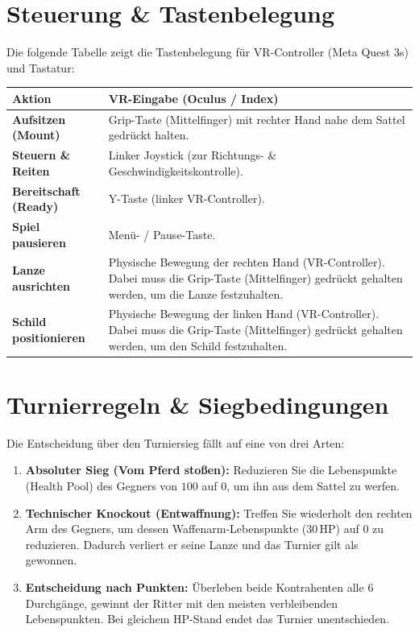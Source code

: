 \documentclass[11pt, a4paper]{article}
\begin{document}
\section{Steuerung \& Tastenbelegung}
Die folgende Tabelle zeigt die Tastenbelegung für VR-Controller (Meta Quest 3s) und Tastatur:

\vspace{0.5cm}
\noindent
\begin{tabularx}{\textwidth}{l X}
    \toprule
    \textbf{Aktion} & \textbf{VR-Eingabe (Oculus / Index)} \\
    \midrule
    \textbf{Aufsitzen (Mount)} & Grip-Taste (Mittelfinger) mit rechter Hand nahe dem Sattel gedrückt halten. \\
    \textbf{Steuern \& Reiten} & Linker Joystick (zur Richtungs- \& Geschwindigkeitskontrolle). \\
    \textbf{Bereitschaft (Ready)} & Y-Taste (linker VR-Controller). \\
    \textbf{Spiel pausieren} & Menü- / Pause-Taste. \\
    \textbf{Lanze ausrichten} & Physische Bewegung der rechten Hand (VR-Controller). Dabei muss die Grip-Taste (Mittelfinger) gedrückt gehalten werden, um die Lanze festzuhalten. \\
    \textbf{Schild positionieren} & Physische Bewegung der linken Hand (VR-Controller). Dabei muss die Grip-Taste (Mittelfinger) gedrückt gehalten werden, um den Schild festzuhalten. \\
    \bottomrule
\end{tabularx}
\vspace{0.5cm}

\section{Turnierregeln \& Siegbedingungen}
Die Entscheidung über den Turniersieg fällt auf eine von drei Arten:

\begin{enumerate}
    \item \textbf{Absoluter Sieg (Vom Pferd stoßen):} Reduzieren Sie die Lebenspunkte (Health Pool) des Gegners von $100$ auf $0$, um ihn aus dem Sattel zu werfen.
    \item \textbf{Technischer Knockout (Entwaffnung):} Treffen Sie wiederholt den rechten Arm des Gegners, um dessen Waffenarm-Lebenspunkte ($30\,\text{HP}$) auf $0$ zu reduzieren. Dadurch verliert er seine Lanze und das Turnier gilt als gewonnen.
    \item \textbf{Entscheidung nach Punkten:} Überleben beide Kontrahenten alle 6 Durchgänge, gewinnt der Ritter mit den meisten verbleibenden Lebenspunkten. Bei gleichem HP-Stand endet das Turnier unentschieden.
\end{enumerate}
\end{document}
